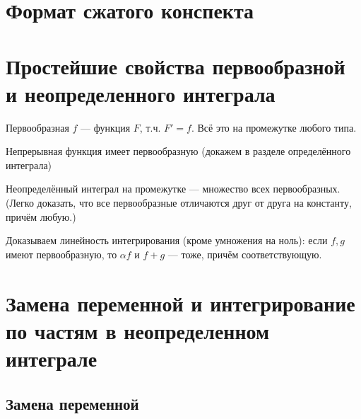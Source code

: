 \documentclass[12pt, a4paper]{article}
\begin{document}
\section{Формат сжатого конспекта}


\section{Простейшие свойства первообразной и неопределенного интеграла}

    Первообразная $f$ — функция $F$, т.ч. $F' = f$. Всё это на промежутке любого типа.


    Непрерывная функция имеет первообразную (докажем в разделе определённого интеграла)

    Неопределённый интеграл на промежутке — множество всех первообразных.
    (Легко доказать, что все первообразные отличаются друг от друга на константу, причём любую.)

    Доказываем линейность интегрирования (кроме умножения на ноль): если $f, g$ имеют первообразную, то $\alpha f$ и $f + g$ — тоже, причём соответствующую.


\section{Замена переменной и интегрирование по частям в неопределенном интеграле}

    \subsection{Замена переменной}
\end{document}

